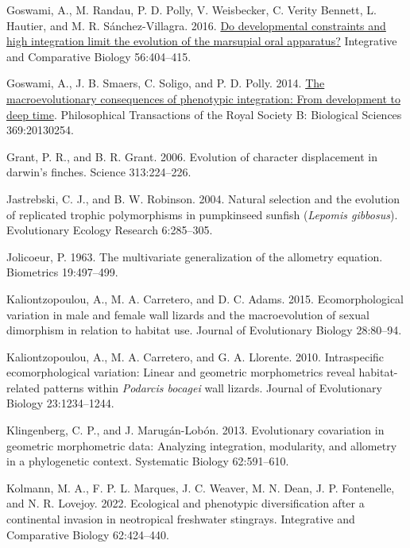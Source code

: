 \documentclass[
  11pt,
]{article}
\newlength{\cslhangindent}
\newlength{\cslentryspacingunit} %
\newenvironment{CSLReferences}[2] %
 {%
  \setlength{\parindent}{0pt}
  \ifodd #1
  \let\oldpar\par
  \def\par{\hangindent=\cslhangindent\oldpar}
  \fi
  \setlength{\parskip}{#2\cslentryspacingunit}
 }%
 {}
\begin{document}
\begin{CSLReferences}{1}{0}
\leavevmode{}%
Goswami, A., M. Randau, P. D. Polly, V. Weisbecker, C. Verity Bennett,
L. Hautier, and M. R. Sánchez-Villagra. 2016.
\href{https://doi.org/10.1093/icb/icw039}{Do developmental constraints
and high integration limit the evolution of the marsupial oral
apparatus?} Integrative and Comparative Biology 56:404--415.

\leavevmode{}%
Goswami, A., J. B. Smaers, C. Soligo, and P. D. Polly. 2014.
\href{https://doi.org/10.1098/rstb.2013.0254}{The macroevolutionary
consequences of phenotypic integration: From development to deep time}.
Philosophical Transactions of the Royal Society B: Biological Sciences
369:20130254.

\leavevmode{}%
Grant, P. R., and B. R. Grant. 2006. Evolution of character displacement
in darwin's finches. Science 313:224--226.

\leavevmode{}%
Jastrebski, C. J., and B. W. Robinson. 2004. Natural selection and the
evolution of replicated trophic polymorphisms in pumpkinseed sunfish
(\emph{{L}epomis gibbosus}). Evolutionary Ecology Research 6:285--305.

\leavevmode{}%
Jolicoeur, P. 1963. The multivariate generalization of the allometry
equation. Biometrics 19:497--499.

\leavevmode{}%
Kaliontzopoulou, A., M. A. Carretero, and D. C. Adams. 2015.
Ecomorphological variation in male and female wall lizards and the
macroevolution of sexual dimorphism in relation to habitat use. Journal
of Evolutionary Biology 28:80--94.

\leavevmode{}%
Kaliontzopoulou, A., M. A. Carretero, and G. A. Llorente. 2010.
Intraspecific ecomorphological variation: Linear and geometric
morphometrics reveal habitat-related patterns within \emph{{P}odarcis
bocagei} wall lizards. Journal of Evolutionary Biology 23:1234--1244.

\leavevmode{}%
Klingenberg, C. P., and J. Marugán-Lobón. 2013. Evolutionary covariation
in geometric morphometric data: Analyzing integration, modularity, and
allometry in a phylogenetic context. Systematic Biology 62:591--610.

\leavevmode{}%
Kolmann, M. A., F. P. L. Marques, J. C. Weaver, M. N. Dean, J. P.
Fontenelle, and N. R. Lovejoy. 2022. Ecological and phenotypic
diversification after a continental invasion in neotropical freshwater
stingrays. Integrative and Comparative Biology 62:424--440.


\end{CSLReferences}
\end{document}
